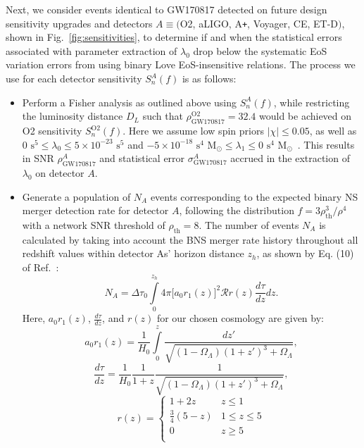 \documentclass[prd,twocolumn,nofootinbib,superscriptaddress,amsmath,amssymb]{revtex4-1}
\begin{document}
Next, we consider events identical to GW170817 detected on future design sensitivity upgrades and detectors $A \equiv ($O2, aLIGO, A\texttt{+}, Voyager, CE, ET-D$)$, shown in Fig.~\ref{fig:sensitivities}, to determine if and when the statistical errors associated with parameter extraction of $\lambda_0$ drop below the systematic EoS variation errors from using binary Love EoS-insensitive relations.
The process we use for each detector sensitivity $S_n^A(f)$ is as follows:
\begin{itemize}
\item Perform a Fisher analysis as outlined above using $S_n^A(f)$, while restricting the luminosity distance $D_L$ such that $\rho^{\text{O2}}_{\text{GW170817}}=32.4$ would be achieved on O2 sensitivity $S_n^{\text{O2}}(f)$.
Here we assume low spin priors $|\chi| \leq 0.05$, as well as $0 \text{ s}^5 \leq \lambda_0 \leq 5 \times 10^{-23} \text{ s}^5$ and $-5 \times 10^{-18} \text{ s}^4\text{ M}_{\odot} \leq \lambda_1 \leq 0 \text{ s}^4\text{ M}_{\odot}$~\cite{delPozzo:TaylorTidal}.
This results in SNR $\rho^A_{\text{GW170817}}$ and statistical error $\sigma_\text{GW170817}^A$ accrued in the extraction of $\lambda_0$ on detector $A$.
\item Generate a population of $N_A$ events corresponding to the expected binary NS merger detection rate for detector $A$, following the distribution $f=3 \rho_{\text{th}}^3/\rho^4$~\cite{Shutz:SNR,Chen:SNR} with a network SNR threshold of $\rho_{\text{th}}=8$.
The number of events $N_A$ is calculated by taking into account the BNS merger rate history throughout all redshift values within detector As' horizon distance $z_h$, as shown by Eq. (10) of Ref.~\cite{Cutler:BNSmerger}:
\begin{equation}
N_A=\Delta \tau_0 \int\limits^{z_{h}}_0 4 \pi \lbrack  a_0r_1(z)\rbrack^2 \mathcal{R} r(z) \frac{d \tau}{dz} dz.
\end{equation}
Here, $a_0r_1(z)$, $\frac{d\tau}{dz}$, and $r(z)$ for our chosen cosmology are given by:
\begin{equation}
a_0r_1(z) = \frac{1}{H_0}\int\limits^z_0 \frac{dz'}{\sqrt{(1-\Omega_{\Lambda})(1+z')^3+\Omega_{\Lambda}}},
\end{equation}
\begin{equation}
\frac{d\tau}{dz} = \frac{1}{H_0} \frac{1}{1+z}\frac{1}{\sqrt{(1-\Omega_{\Lambda})(1+z')^3+\Omega_{\Lambda}}},
\end{equation}
\begin{equation}
r(z) = \left\{
\begin{array}{ll}
      1+2z & z \leq 1 \\
      \frac{3}{4}(5-z) & 1\leq z\leq 5 \\
      0 & z\geq 5\\ 
\end{array} 
\right.
\end{equation}


\end{itemize}
\end{document}
